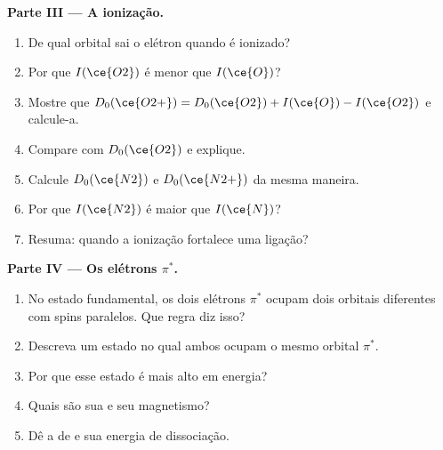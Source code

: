 \begin{problem}
\medskip
\noindent\textbf{Parte III --- A ionização.}
\begin{enumerate}[resume]
  \item De qual orbital sai o elétron quando  é ionizado?
  \item Por que $I(\ce{O2})$ é menor que $I(\ce{O})$?
  \item Mostre que $D_0(\ce{O2+}) = D_0(\ce{O2}) + I(\ce{O}) - I(\ce{O2})$ e calcule-a.
  \item Compare com $D_0(\ce{O2})$ e explique.
  \item Calcule $D_0(\ce{N2})$ e $D_0(\ce{N2+})$ da mesma maneira.
  \item Por que $I(\ce{N2})$ é maior que $I(\ce{N})$?
  \item Resuma: quando a ionização fortalece uma ligação?
\end{enumerate}

\medskip
\noindent\textbf{Parte IV --- Os elétrons $\pi^*$.}
\begin{enumerate}[resume]
  \item No estado fundamental, os dois elétrons $\pi^*$ ocupam dois orbitais
        diferentes com spins paralelos. Que regra diz isso?
  \item Descreva um estado no qual ambos ocupam o mesmo orbital $\pi^*$.
  \item Por que esse estado é mais alto em energia?
  \item Quais são sua  e seu magnetismo?
  \item Dê a  de  e sua energia de dissociação.
\end{enumerate}
\end{problem}
